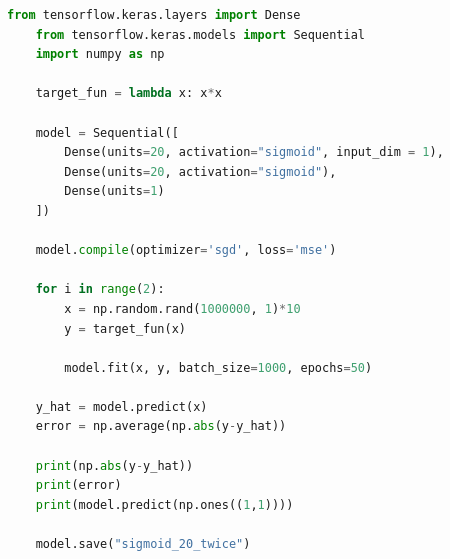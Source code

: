 \documentclass{beamer}
\begin{document}
    \begin{landscape}
        \begin{frame}[fragile]


            \begin{lstlisting}[language=Python]
    from tensorflow.keras.layers import Dense
    from tensorflow.keras.models import Sequential
    import numpy as np

    target_fun = lambda x: x*x

    model = Sequential([
        Dense(units=20, activation="sigmoid", input_dim = 1),
        Dense(units=20, activation="sigmoid"),
        Dense(units=1)
    ])

    model.compile(optimizer='sgd', loss='mse')

    for i in range(2):
        x = np.random.rand(1000000, 1)*10
        y = target_fun(x)

        model.fit(x, y, batch_size=1000, epochs=50)

    y_hat = model.predict(x)
    error = np.average(np.abs(y-y_hat))

    print(np.abs(y-y_hat))
    print(error)
    print(model.predict(np.ones((1,1))))

    model.save("sigmoid_20_twice")
            \end{lstlisting}

        \end{frame}
    \end{landscape}
\end{document}
